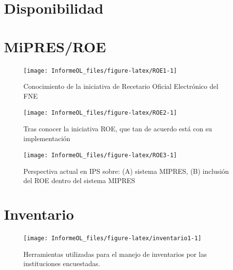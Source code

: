 \documentclass[
  oneside]{book}
\begin{document}
\hypertarget{disponibilidad}{%
\chapter{Disponibilidad}\label{disponibilidad}}

\hypertarget{mipresroe}{%
\chapter{MiPRES/ROE}\label{mipresroe}}

\begin{figure}

{\centering \texttt{[image: InformeOL\_files/figure-latex/ROE1-1]} 

}

\caption{Conocimiento de la iniciativa de Recetario Oficial Electrónico del FNE}\label{fig:ROE1}
\end{figure}

\begin{figure}

{\centering \texttt{[image: InformeOL\_files/figure-latex/ROE2-1]} 

}

\caption{Tras conocer la iniciativa ROE, que tan de acuerdo está con su implementación}\label{fig:ROE2}
\end{figure}

\begin{figure}

{\centering \texttt{[image: InformeOL\_files/figure-latex/ROE3-1]} 

}

\caption{Perspectiva actual en IPS sobre: (A) sistema MIPRES, (B) inclusión del ROE dentro del sistema MIPRES}\label{fig:ROE3}
\end{figure}

\hypertarget{inventario}{%
\chapter{Inventario}\label{inventario}}

\begin{figure}

{\centering \texttt{[image: InformeOL\_files/figure-latex/inventario1-1]} 

}

\caption{Herramientas utilizadas para el manejo de inventarios por las instituciones encuestadas.}\label{fig:inventario1}
\end{figure}
\end{document}
